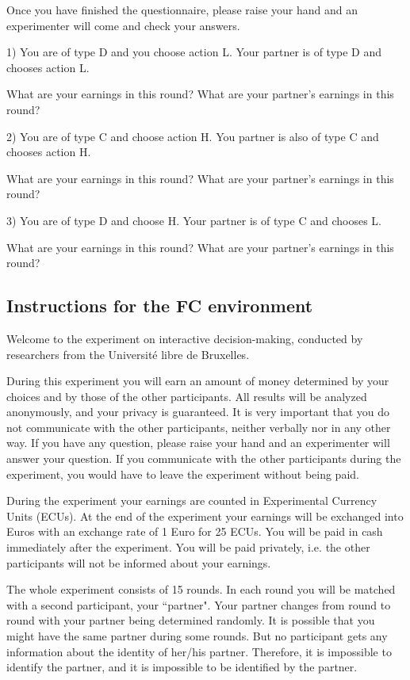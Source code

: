 \documentclass[12pt]{article}
\theoremstyle{break}
\begin{document}
Once you have finished the questionnaire, please raise your hand and an experimenter will come and check your answers.

1) You are of type D and you choose action L. Your partner is of type D and chooses action L.

What are your earnings in this round?
What are your partner’s earnings in this round?

2) You are of type C and choose action H. You partner is also of type C and chooses action H.

What are your earnings in this round?
What are your partner’s earnings in this round?


3) You are of type D and choose H. Your partner is of type C and chooses L.

What are your earnings in this round?
What are your partner’s earnings in this round?


\subsection{Instructions for the FC environment}

Welcome to the experiment on interactive decision-making, conducted by researchers from the Université libre de Bruxelles.

During this experiment you will earn an amount of money determined by your choices and by those of the other participants. All results will be analyzed anonymously, and your privacy is guaranteed. It is very important that you do not communicate with the other participants, neither verbally nor in any other way. If you have any question, please raise your hand and an experimenter will answer your question. If you communicate with the other participants during the experiment, you would have to leave the experiment without being paid. 

During the experiment your earnings are counted in Experimental Currency Units (ECUs). At the end of the experiment your earnings will be exchanged into Euros with an exchange rate of 1 Euro for 25 ECUs. You will be paid in cash immediately after the experiment. You will be paid privately, i.e. the other participants will not be informed about your earnings.

The whole experiment consists of 15 rounds. In each round you will be matched with a second participant, your ``partner". Your partner changes from round to round with your partner being determined randomly. It is possible that you might have the same partner during some rounds. But no participant gets any information about the identity of her/his partner. Therefore, it is impossible to identify the partner, and it is impossible to be identified by the partner.
\end{document}
